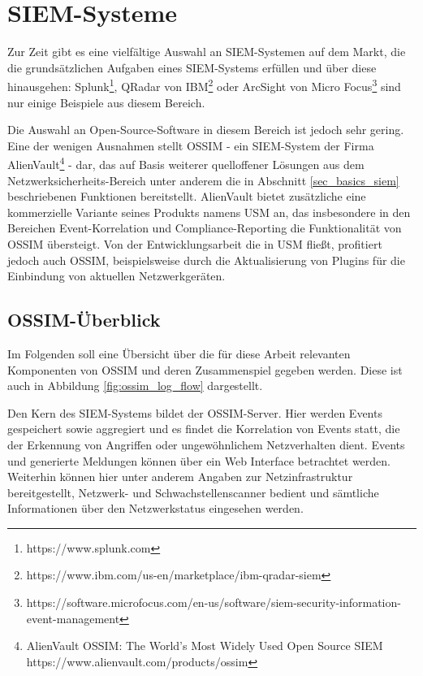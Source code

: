 \section{SIEM-Systeme}

\label{sec_state_siem}

Zur Zeit gibt es eine vielfältige Auswahl an SIEM-Systemen auf dem Markt, die die grundsätzlichen Aufgaben eines SIEM-Systems erfüllen und über diese hinausgehen: Splunk\footnote{
  https://www.splunk.com
}, QRadar von IBM\footnote{
  https://www.ibm.com/us-en/marketplace/ibm-qradar-siem
} oder ArcSight von Micro Focus\footnote{
  https://software.microfocus.com/en-us/software/siem-security-information-event-management
} sind nur einige Beispiele aus diesem Bereich. 

Die Auswahl an Open-Source-Software in diesem Bereich ist jedoch sehr gering. Eine der wenigen Ausnahmen stellt OSSIM - ein SIEM-System der Firma AlienVault\footnote{
	AlienVault OSSIM: The World’s Most Widely Used Open Source SIEM\\https://www.alienvault.com/products/ossim
} - dar, das auf Basis weiterer quelloffener Lösungen aus dem Netzwerksicherheits-Bereich unter anderem die in Abschnitt \ref{sec_basics_siem} beschriebenen Funktionen bereitstellt. AlienVault bietet zusätzliche eine kommerzielle Variante seines Produkts namens USM an, das insbesondere in den Bereichen Event-Korrelation und Compliance-Reporting die Funktionalität von OSSIM übersteigt. Von der Entwicklungsarbeit die in USM fließt, profitiert jedoch auch OSSIM, beispielsweise durch die Aktualisierung von Plugins für die Einbindung von aktuellen Netzwerkgeräten.

\subsection{OSSIM-Überblick}

\label{subsec_state_siem_overview}

Im Folgenden soll eine Übersicht über die für diese Arbeit relevanten Komponenten von OSSIM und deren Zusammenspiel gegeben werden. Diese ist auch in Abbildung \ref{fig:ossim_log_flow} dargestellt.

Den Kern des SIEM-Systems bildet der OSSIM-Server. Hier werden Events gespeichert sowie aggregiert und es findet die Korrelation von Events statt, die der Erkennung von Angriffen oder ungewöhnlichem Netzverhalten dient. Events und generierte Meldungen können über ein Web Interface betrachtet werden. Weiterhin können hier unter anderem Angaben zur Netzinfrastruktur bereitgestellt, Netzwerk- und Schwachstellenscanner bedient und sämtliche Informationen über den Netzwerkstatus eingesehen werden. 


